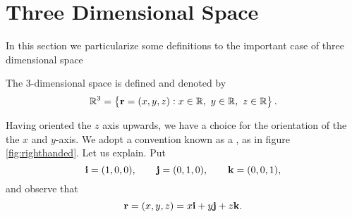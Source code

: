 


\section{Three Dimensional Space}

In this section we particularize some definitions to the important case of 
three dimensional space 

\begin{df}
The $3$-dimensional space is defined and denoted by
$$ \reals^3= \left\{\point{r}=(x,y,z): x\in \reals, \ y\in\reals, \ z\in\reals\right\}. $$
\end{df}
% 
% 

Having oriented the $z$ axis upwards, we have a choice for the
orientation of the the $x$ and $y$-axis. We adopt a convention known
as a , as in figure
\ref{fig:righthanded}. Let us explain. Put 
$$\mathbf{ i} = (1, 0, 0), \qquad \mathbf{ j} = (0, 1, 0), \qquad \mathbf{ k} = (0, 0, 1),   $$
and observe that
$$ {\mathbf r}=(x,y,z) = x\mathbf{ i}+  y\mathbf{ j}+  z\mathbf{ k}.$$



